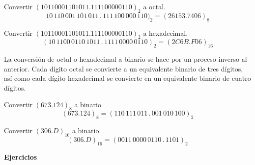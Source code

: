 \begin{example}{\rm
    Convertir $(10110001101011.111100000110)_{2}$ a octal.
    $$10\, 110\, 001\, 101\, 011\, .\, 111\, 100\, 000\, 110)_{2} = (26153.7406)_{8}$$
}\end{example}

\begin{example}{\rm
    Convertir $(10110001101011.111100000110)_{2}$ a hexadecimal.
    $$(10\, 1100\, 0110\, 1011\, .\, 1111\, 0000\, 0110)_{2} = (2C6B.F06)_{16}$$

  La conversión de octal o hexadecimal a binario se hace por un proceso inverso al anterior. Cada dígito octal se convierte a un equivalente binario de tres dígitos, así como cada 
  dígito hexadecimal se convierte en un equivalente binario de cuatro dígitos.  
}\end{example}

\begin{example}{\rm
    Convertir $(673.124)_{8}$ a binario 
    $$(673.124)_{8} = (110\, 111\, 011\, .\, 001\, 010\, 100)_{2}$$
}\end{example}

\begin{example}{\rm
    Convertir $(306.D)_{16}$ a binario
    $$(306.D)_{16} = (0011\, 0000\, 0110\, .\, 1101)_{2}$$
}\end{example}


\begin{large}
\textbf{Ejercicios}
\end{large}

